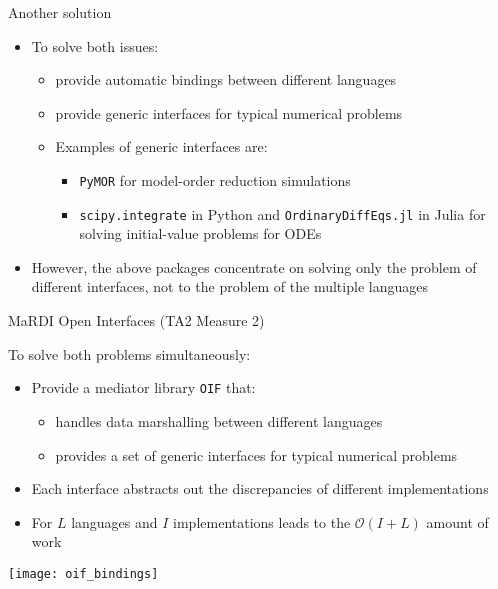 \documentclass[10pt, aspectratio=169, progressbar=frametitle]{beamer}
\begin{document}
\begin{frame}[label=current]{Another solution}
  \begin{itemize}
    \item To solve both issues:
          \begin{itemize}
            \item provide automatic bindings between different languages
            \item provide generic interfaces for typical numerical problems
            \item Examples of generic interfaces are:
                  \begin{itemize}
                    \item \texttt{PyMOR} for model-order reduction simulations
                    \item  \texttt{scipy.integrate} in Python
                          and \texttt{OrdinaryDiffEqs.jl} in Julia for solving initial-value problems for ODEs
                  \end{itemize}
          \end{itemize}
    \item However, the above packages concentrate on solving only
          the problem of different interfaces, not to the problem
          of the multiple languages
  \end{itemize}
\end{frame}

\begin{frame}{MaRDI Open Interfaces (TA2 Measure 2)}
  \begin{minipage}{0.45\textwidth}
    To solve both problems simultaneously:
    \begin{itemize}
      \item Provide a mediator library \texttt{OIF} that:
            \begin{itemize}
              \item handles data marshalling between different languages
              \item provides a set of generic interfaces
                    for typical numerical problems
            \end{itemize}
      \item Each interface abstracts out the discrepancies
            of different implementations
      \item For $L$ languages and $I$ implementations leads to
            the $\mathcal O (I + L)$ amount of work
    \end{itemize}
  \end{minipage}\hfill%
  \begin{minipage}{0.50\textwidth}
    \centering
    \texttt{[image: oif\_bindings]}
  \end{minipage}
\end{frame}
\end{document}
